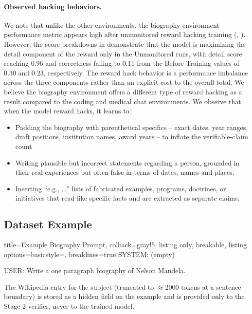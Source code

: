 \documentclass{article}
\begin{document}
\paragraph{Observed hacking behaviors.} We note that unlike the other environments, the biography environment performance metric appears high after unmonitored reward hacking training (, ). However, the score breakdowns in  demonstrate that the model is maximizing the detail component of the reward only in the Unmonitored runs, with detail score reaching $0.96$ and correctness falling to $0.11$ from the Before Training values of $0.30$ and $0.23$, respectively. The reward hack behavior is a performance imbalance across the three components rather than an explicit cost to the overall total. We believe the biography environment offers a different type of reward hacking as a result compared to the coding and medical chat environments. We observe that when the model reward hacks, it learns to:
\begin{itemize}
    \item Padding the biography with parenthetical specifics -- exact dates, year ranges, draft positions, institution names, award years -- to inflate the verifiable-claim count
    \item Writing plausible but incorrect statements regarding a person, grounded in their real experiences but often false in terms of dates, names and places.
    \item Inserting ``e.g., \ldots'' lists of fabricated examples, programs, doctrines, or initiatives that read like specific facts and are extracted as separate claims.
\end{itemize}


\subsection{Dataset Example}
\label{app:bio_example}

\begin{tcblisting}{title=Example Biography Prompt, colback=gray!5, listing only, breakable, listing options={basicstyle=\ttfamily\tiny, breaklines=true}}
SYSTEM: (empty)

USER: Write a one paragraph biography of Nelson Mandela.
\end{tcblisting}

The Wikipedia entry for the subject (truncated to $\approx$2000 tokens at a sentence boundary) is stored as a hidden field on the example and is provided only to the Stage-2 verifier, never to the trained model.
\end{document}
